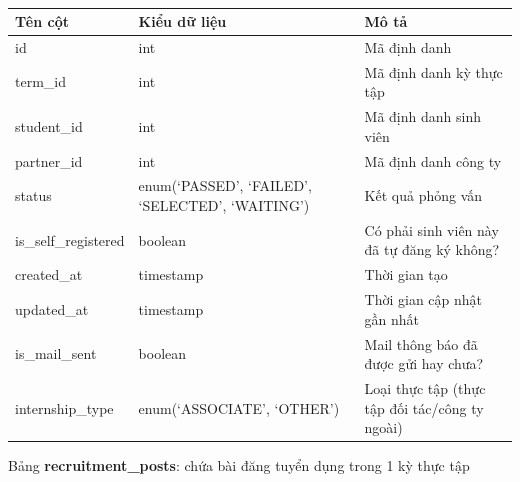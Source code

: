 \documentclass[./../main.tex]{subfiles}
\begin{document}
\begin{table}[H]
	\caption{}
	\label{tab:db_term_partner_regs}
	\begin{tabularx}{\textwidth}{|l|X|X|}
	\hline
	\textbf{Tên cột}     & \textbf{Kiểu dữ liệu}                           & \textbf{Mô tả}                                 \\ \hline
	id                   & int                                             & Mã định danh                                   \\ \hline
	term\_id             & int                                             & Mã định danh kỳ thực tập                       \\ \hline
	student\_id          & int                                             & Mã định danh sinh viên                         \\ \hline
	partner\_id          & int                                             & Mã định danh công ty                           \\ \hline
	status               & enum(‘PASSED', ‘FAILED', ‘SELECTED', ‘WAITING') & Kết quả phỏng vấn                              \\ \hline
	is\_self\_registered & boolean                                         & Có phải sinh viên này đã tự đăng ký không?     \\ \hline
	created\_at          & timestamp                                       & Thời gian tạo                                  \\ \hline
	updated\_at          & timestamp                                       & Thời gian cập nhật gần nhất                    \\ \hline
	is\_mail\_sent       & boolean                                         & Mail thông báo đã được gửi hay chưa?           \\ \hline
	internship\_type     & enum(‘ASSOCIATE’, ‘OTHER')                      & Loại thực tập (thực tập đối tác/công ty ngoài) \\ \hline
	\end{tabularx}
\end{table}

Bảng \textbf{recruitment\_posts}: chứa bài đăng tuyển dụng trong 1 kỳ thực tập
\end{document}
